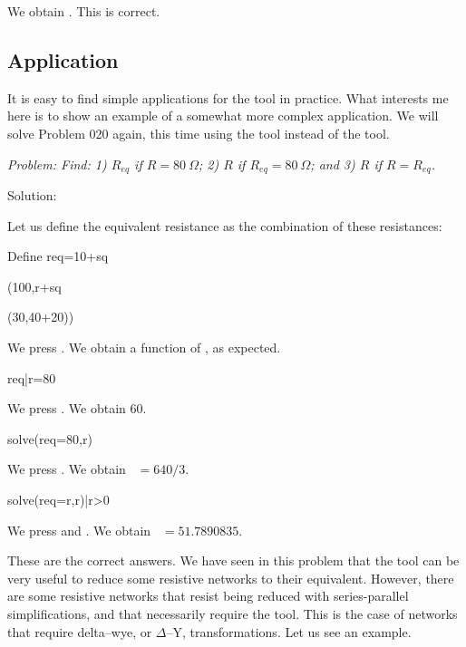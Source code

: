 We obtain . This is correct.

\subsection{Application}

It is easy to find simple applications for the  tool in
practice. What interests me here is to show an example of a somewhat
more complex application. We will solve Problem 020 again, this time
using the  tool instead of the  tool.


\emph{Problem: Find: 1) $R_{eq}$ if $R = 80~\Omega$; 2) $R$ if
$R_{eq} = 80~\Omega$; and 3) $R$ if $R = R_{eq}$.}

Solution:

Let us define the equivalent resistance  as the
combination of these resistances:

\begin{entry}
Define req=10+sq\par(100,r+sq\par(30,40+20))
\end{entry}

We press . We obtain a function of , as expected.

\begin{entry}
req|r=80
\end{entry}

We press . We obtain 60.

\begin{entry}
solve(req=80,r)
\end{entry}

We press . We obtain ~$= 640/3$.

\begin{entry}
solve(req=r,r)|r>0
\end{entry}

We press \key{$\diamond$} and . We obtain
~$= 51.7890835$.

These are the correct answers. We have seen in this problem that the
 tool can be very useful to reduce some resistive networks
to their equivalent. However, there are some resistive networks that
resist being reduced with series-parallel simplifications, and that
necessarily require the  tool. This is the case of
networks that require delta--wye, or $\Delta$--Y, transformations.
Let us see an example.

